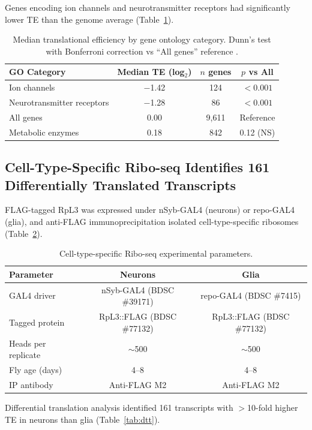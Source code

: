 \documentclass[11pt]{article}
\begin{document}
Genes encoding ion channels and neurotransmitter receptors had significantly lower TE than the genome average (Table~\ref{tab:go_te}).

\begin{table}[H]
\centering
\caption{Median translational efficiency by gene ontology category. Dunn's test with Bonferroni correction vs ``All genes'' reference \citep{dunn_test1964}.}
\label{tab:go_te}
\begin{tabular}{lccc}
\toprule
GO Category & Median TE (log$_2$) & $n$ genes & $p$ vs All \\
\midrule
Ion channels & $-$1.42 & 124 & $\mathbf{< 0.001}$ \\
Neurotransmitter receptors & $-$1.28 & 86 & $\mathbf{< 0.001}$ \\
All genes & 0.00 & 9,611 & Reference \\
Metabolic enzymes & 0.18 & 842 & 0.12 (NS) \\
\bottomrule
\end{tabular}
\end{table}

\subsection{Cell-Type-Specific Ribo-seq Identifies 161 Differentially Translated Transcripts}

FLAG-tagged RpL3 was expressed under nSyb-GAL4 (neurons) or repo-GAL4 (glia), and anti-FLAG immunoprecipitation isolated cell-type-specific ribosomes (Table~\ref{tab:celltype_setup}).

\begin{table}[H]
\centering
\caption{Cell-type-specific Ribo-seq experimental parameters.}
\label{tab:celltype_setup}
\begin{tabular}{lcc}
\toprule
Parameter & Neurons & Glia \\
\midrule
GAL4 driver & nSyb-GAL4 (BDSC \#39171) & repo-GAL4 (BDSC \#7415) \\
Tagged protein & RpL3::FLAG (BDSC \#77132) & RpL3::FLAG (BDSC \#77132) \\
Heads per replicate & $\sim$500 & $\sim$500 \\
Fly age (days) & 4--8 & 4--8 \\
IP antibody & Anti-FLAG M2 & Anti-FLAG M2 \\
\bottomrule
\end{tabular}
\end{table}

Differential translation analysis identified 161 transcripts with $>$10-fold higher TE in neurons than glia (Table~\ref{tab:dtt}).
\end{document}
